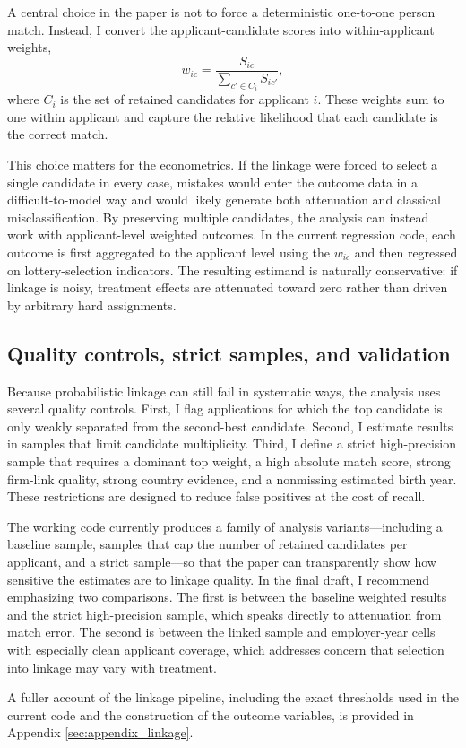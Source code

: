 A central choice in the paper is not to force a deterministic one-to-one person match. Instead, I convert the applicant-candidate scores into within-applicant weights,
\begin{equation}
\label{eq:weights}
 w_{ic} = \frac{S_{ic}}{\sum_{c' \in C_i} S_{ic'}},
\end{equation}
where $C_i$ is the set of retained candidates for applicant $i$. These weights sum to one within applicant and capture the relative likelihood that each candidate is the correct match.

This choice matters for the econometrics. If the linkage were forced to select a single candidate in every case, mistakes would enter the outcome data in a difficult-to-model way and would likely generate both attenuation and classical misclassification. By preserving multiple candidates, the analysis can instead work with applicant-level weighted outcomes. In the current regression code, each outcome is first aggregated to the applicant level using the $w_{ic}$ and then regressed on lottery-selection indicators. The resulting estimand is naturally conservative: if linkage is noisy, treatment effects are attenuated toward zero rather than driven by arbitrary hard assignments.

\subsection{Quality controls, strict samples, and validation}

Because probabilistic linkage can still fail in systematic ways, the analysis uses several quality controls. First, I flag applications for which the top candidate is only weakly separated from the second-best candidate. Second, I estimate results in samples that limit candidate multiplicity. Third, I define a strict high-precision sample that requires a dominant top weight, a high absolute match score, strong firm-link quality, strong country evidence, and a nonmissing estimated birth year. These restrictions are designed to reduce false positives at the cost of recall.

The working code currently produces a family of analysis variants---including a baseline sample, samples that cap the number of retained candidates per applicant, and a strict sample---so that the paper can transparently show how sensitive the estimates are to linkage quality. In the final draft, I recommend emphasizing two comparisons. The first is between the baseline weighted results and the strict high-precision sample, which speaks directly to attenuation from match error. The second is between the linked sample and employer-year cells with especially clean applicant coverage, which addresses concern that selection into linkage may vary with treatment.

A fuller account of the linkage pipeline, including the exact thresholds used in the current code and the construction of the outcome variables, is provided in Appendix \ref{sec:appendix_linkage}.
